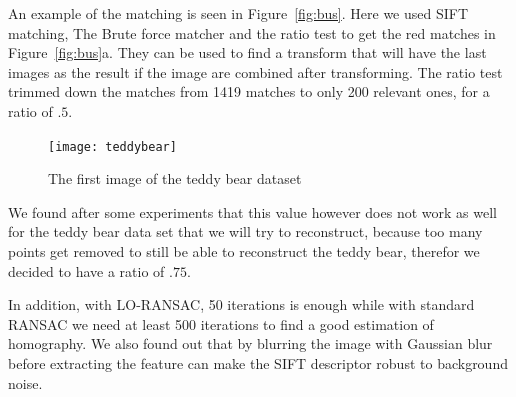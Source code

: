 An example of the matching is seen in Figure~\ref{fig:bus}. 
Here we used SIFT matching, The Brute force matcher and the ratio test to get the red matches in Figure~\ref{fig:bus}a. 
They can be used to find a transform that will have the last images as the result if the image are combined after transforming.
The ratio test trimmed down the matches from 1419 matches to only 200 relevant ones, for a ratio of $.5$.

\begin{figure}[ht]
	\centering
	\texttt{[image: teddybear]}
	\caption{The first image of the teddy bear dataset}
	\label{fig:bear}
\end{figure}

We found after some experiments that this value however does not work as well for the teddy bear data set that we will try to reconstruct, because too many points get removed to still be able to reconstruct the teddy bear,
therefor we decided to have a ratio of $.75$.

In addition, with LO-RANSAC, 50 iterations is enough while with standard RANSAC we need at least 500 iterations to find a good estimation of homography.
We also found out that by blurring the image with Gaussian blur before extracting the feature can make the SIFT descriptor robust to background noise.
